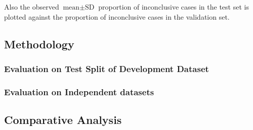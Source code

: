 Also the observed $\text{mean} \pm \text{SD}$ proportion of inconclusive cases in the test set is plotted 
against the proportion of inconclusive cases in the validation set.


\subsection{Methodology}
\label{subsec:eval_methodology}

\subsubsection{Evaluation on Test Split of Development Dataset}
\label{subsubsec:eval_dev}





\subsubsection{Evaluation on Independent datasets}
\label{subsubsec:eval_independent}




\subsection{Comparative Analysis}
\label{subsec:compar_anal}

